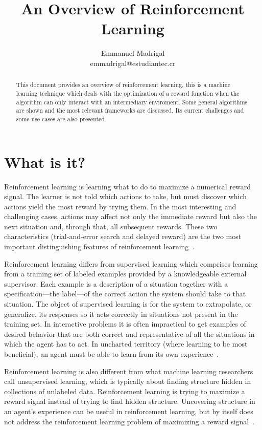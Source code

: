 \documentclass[letterpaper, 10 pt]{IEEEconf}
\title{\LARGE \bf An Overview of Reinforcement Learning}
\author{
  Emmanuel Madrigal \\
  \vspace{3pt}
  emmadrigal@estudiantec.cr
  \vspace{-18pt}
}
\begin{document}
\maketitle

\begin{abstract}
	This document provides an overview of reinforcement learning, this
	is a machine learning technique which deals with the optimization of
	a reward function when the algorithm can only interact with an
	intermediary enviroment. Some general algorithms are shown and the
	most relevant frameworks are discussed. Its current challenges and
	some use cases are also presented.
\end{abstract}

\section{What is it?}

Reinforcement learning is learning what to do to maximize a numerical
reward signal. The learner is not told which actions to take, but must
discover which actions yield the most reward by trying them. In the
most interesting and challenging cases, actions may affect not only
the immediate reward but also the next situation and, through that,
all subsequent rewards. These two characteristics (trial-and-error
search and delayed reward) are the two most important distinguishing
features of reinforcement learning~\cite{sutton2018reinforcement}.

Reinforcement learning differs from supervised learning which
comprises learning from a training set of labeled examples provided by
a knowledgeable external supervisor. Each example is a description of
a situation together with a specification—the label—of the correct
action the system should take to that situation. The object of
supervised learning is for the system to extrapolate, or generalize,
its responses so it acts correctly in situations not present in the
training set. In interactive problems it is often impractical to get
examples of desired behavior that are both correct and representative
of all the situations in which the agent has to act. In uncharted
territory (where learning to be most beneficial), an agent must be
able to learn from its own experience~\cite{sutton2018reinforcement}.

Reinforcement learning is also different from what machine learning
researchers call unsupervised learning, which is typically about
finding structure hidden in collections of unlabeled
data. Reinforcement learning is trying to maximize a reward signal
instead of trying to find hidden structure. Uncovering structure in an
agent’s experience can be useful in reinforcement learning, but by
itself does not address the reinforcement learning problem of
maximizing a reward signal~\cite{sutton2018reinforcement}.
\end{document}
